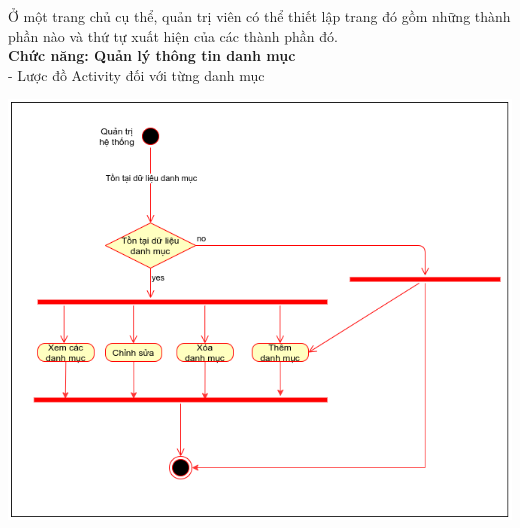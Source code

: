 Ở một trang chủ cụ thể, quản trị viên có thể thiết lập trang đó gồm những thành phần nào và thứ tự xuất hiện của các thành phần đó.\\
\textbf{Chức năng: Quản lý thông tin danh mục}\\
- Lược đồ Activity đối với từng danh mục
\begin{center}
  \captionsetup{type=figure}
  \includegraphics[scale=0.7]{img/UML/Admin/danhmucActivity.png}
\end{center}
